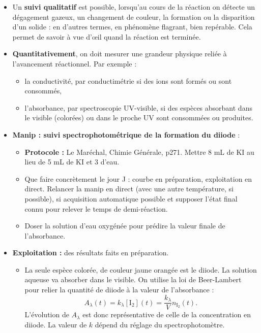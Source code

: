 \documentclass[11pt,a4paper]{report}
\begin{document}
\begin{itemize}
	\item Un \textbf{suivi qualitatif} est possible, lorsqu'au cours de la réaction on détecte 		un dégagement gazeux, un changement de couleur, la formation ou la disparition d'un solide : en d'autres termes, en phénomène flagrant, bien repérable. Cela permet de savoir à vue d'œil quand la réaction est terminée.\\
	
	\item \textbf{Quantitativement}, on doit mesurer une grandeur physique reliée à l'avancement réactionnel. Par exemple :
	\begin{itemize}
		\item la conductivité, par conductimétrie si des ions sont formés ou sont consommés,
		\item l'absorbance, par spectroscopie UV-visible, si des espèces absorbant dans le 					visible (colorées) ou dans le proche UV sont consommées ou produites.\\
	\end{itemize}
	
	\item \textbf{Manip : suivi spectrophotométrique de la formation du diiode} :
	\begin{itemize}
		\item \textbf{Protocole :} Le Maréchal, Chimie Générale, p271. 
		Mettre 8 mL de KI au lieu de 5 mL de KI et 3 d'eau.
		\item Que faire concrètement le jour J : courbe en préparation, exploitation en direct. 			Relancer la manip en direct (avec une autre température, si possible), si acquisition 				automatique possible et supposer l'état final connu pour relever le temps de demi-réaction.
		\item Doser la solution d'eau oxygénée pour prédire la valeur finale de l'absorbance.\\
	\end{itemize}

	\item \textbf{Exploitation :} des résultats faits en préparation.
	\begin{itemize}
		\item La seule espèce colorée, de couleur jaune orangée est le diiode. La solution aqueuse 			va absorber dans le visible. On utilise la loi de Beer-Lambert pour relier la quantité de 			diiode à la valeur de l'absorbance :
		\begin{equation}
			A_\lambda(t) = k_\lambda [\text{I}_2](t) = \frac{k_\lambda}{V} n_{\text{I}_2}(t) .
		\end{equation}
		L'évolution de $A_\lambda$ est donc représentative de celle de la concentration en diiode. 			La valeur de $k$ dépend du réglage du spectrophotomètre.\\
	\end{itemize}
\end{itemize}
\end{document}
